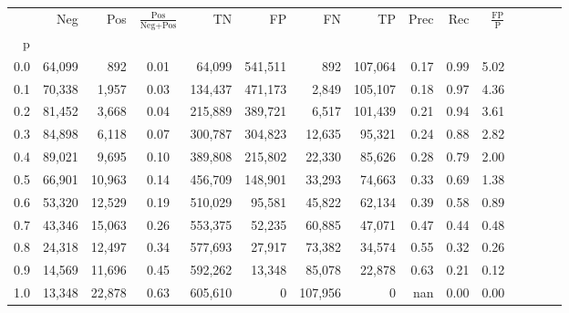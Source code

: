\begin{tabular}{rrrcrrrrrrrrrrr}
\toprule
{} &     Neg &     Pos & $\frac{\text{Pos}}{\text{Neg}+\text{Pos}}$ &       TN &       FP &       FN &       TP &  Prec &   Rec & $\frac{\text{FP}}{\text{P}}$ \\
p   &         &         &                                            &          &          &          &          &       &       &                              \\
\midrule
0.0 &  64,099 &     892 &                                       0.01 &   64,099 &  541,511 &      892 &  107,064 &  0.17 &  0.99 &                         5.02 \\
0.1 &  70,338 &   1,957 &                                       0.03 &  134,437 &  471,173 &    2,849 &  105,107 &  0.18 &  0.97 &                         4.36 \\
0.2 &  81,452 &   3,668 &                                       0.04 &  215,889 &  389,721 &    6,517 &  101,439 &  0.21 &  0.94 &                         3.61 \\
0.3 &  84,898 &   6,118 &                                       0.07 &  300,787 &  304,823 &   12,635 &   95,321 &  0.24 &  0.88 &                         2.82 \\
0.4 &  89,021 &   9,695 &                                       0.10 &  389,808 &  215,802 &   22,330 &   85,626 &  0.28 &  0.79 &                         2.00 \\
0.5 &  66,901 &  10,963 &                                       0.14 &  456,709 &  148,901 &   33,293 &   74,663 &  0.33 &  0.69 &                         1.38 \\
0.6 &  53,320 &  12,529 &                                       0.19 &  510,029 &   95,581 &   45,822 &   62,134 &  0.39 &  0.58 &                         0.89 \\
0.7 &  43,346 &  15,063 &                                       0.26 &  553,375 &   52,235 &   60,885 &   47,071 &  0.47 &  0.44 &                         0.48 \\
0.8 &  24,318 &  12,497 &                                       0.34 &  577,693 &   27,917 &   73,382 &   34,574 &  0.55 &  0.32 &                         0.26 \\
0.9 &  14,569 &  11,696 &                                       0.45 &  592,262 &   13,348 &   85,078 &   22,878 &  0.63 &  0.21 &                         0.12 \\
1.0 &  13,348 &  22,878 &                                       0.63 &  605,610 &        0 &  107,956 &        0 &   nan &  0.00 &                         0.00 \\
\bottomrule
\end{tabular}
